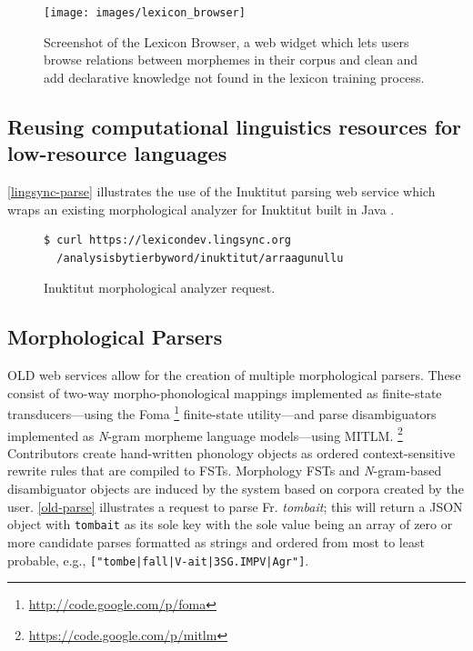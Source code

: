 \documentclass[11pt]{article}
\begin{document}
\begin{figure}
\begin{center}
\texttt{[image: images/lexicon\_browser]}
\caption{Screenshot of the Lexicon Browser, a web widget which lets users browse relations between morphemes in their corpus and clean and add declarative knowledge not found in the lexicon training process.}
\label{lexicon_browser_screenshot}
\end{center}
\end{figure}



\subsection{Reusing computational linguistics resources for low-resource languages}

\autoref{lingsync-parse} illustrates the use of the Inuktitut parsing web service which wraps an existing
morphological analyzer for Inuktitut built in Java \cite{Farley:2012:Online}.


\begin{figure}[h]
\scriptsize
\begin{verbatim}
$ curl https://lexicondev.lingsync.org
  /analysisbytierbyword/inuktitut/arraagunullu
\end{verbatim}
\normalsize
\caption{Inuktitut morphological analyzer request.}
\label{lingsync-parse}
\end{figure}



\subsection{Morphological Parsers}

OLD web services allow for the creation of multiple morphological parsers.
These consist of two-way morpho-phonological mappings implemented as
finite-state transducers---using the Foma%
\footnote{\url{http://code.google.com/p/foma}} %
finite-state utility---and parse disambiguators implemented as \textit{N}-gram
morpheme language models---using MITLM.%
\footnote{\url{https://code.google.com/p/mitlm}}
Contributors create hand-written phonology objects as ordered context-sensitive
rewrite rules that are compiled to FSTs. Morphology FSTs and \textit{N}-gram-based
disambiguator objects are induced by the system based on corpora created by the 
user. \autoref{old-parse} illustrates a request to parse Fr. \textit{tombait};
this will return a JSON object with \texttt{tombait} as its sole key with the 
sole value being an array of zero or more candidate parses formatted as strings and 
ordered from most to least probable, e.g., \texttt{["tombe|fall|V-ait|3SG.IMPV|Agr"]}.
\end{document}
